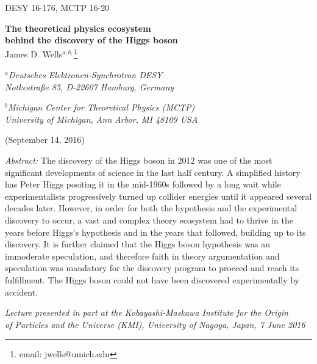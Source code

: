 \documentclass[letter,12pt]{article}
\begin{document}
\begin{flushright}
DESY 16-176,
MCTP 16-20
\end{flushright}

\vspace{0.1in}

\noindent
\begin{center}
{\bf\Large The theoretical physics ecosystem \\ \vspace{0.1in}
behind the discovery of the Higgs boson} \\

\vspace{0.75cm}
{\large James D. Wells${}^{a,b,}$}\footnote{email: jwells@umich.edu}

{\it ${}^a$Deutsches Elektronen-Synchrotron DESY \\
Notkestra\ss e 85, D-22607 Hamburg, Germany}

{\it ${}^b$Michigan Center for Theoretical Physics (MCTP) \\
University of Michigan, Ann Arbor, MI 48109 USA} 


(September 14, 2016)
\end{center}

\bigskip\bigskip
\noindent
{\it Abstract:} The discovery of the Higgs boson in 2012 was one of the most significant developments of science in the last half century. A simplified history has Peter Higgs positing it in the mid-1960s followed by a long wait while experimentalists progressively turned up collider energies until it appeared several decades later. However, in order for both the hypothesis and the experimental discovery to occur, a vast and complex theory ecosystem had to thrive in the years before Higgs's hypothesis and in the years that followed, building up to its discovery. 
It is further claimed that the Higgs boson hypothesis was an immoderate speculation, and therefore faith in theory argumentation and speculation was mandatory for the discovery program to proceed and reach its fulfillment. 
The Higgs boson could not have been discovered experimentally by accident. 

\vspace{0.7cm}
\begin{center}
{\it Lecture presented in part at the Kobayashi-Maskawa Institute for the Origin \\ of Particles and the Universe (KMI), University of Nagoya, Japan, 7 June 2016}
\end{center}
\end{document}

